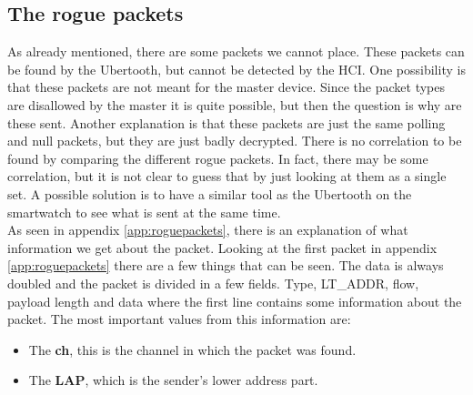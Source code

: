 \subsection{The rogue packets}
As already mentioned, there are some packets we cannot place. These packets can be found by the Ubertooth, but cannot be detected by the HCI. One possibility is that these packets are not meant for the master device. Since the packet types are disallowed by the master it is quite possible, but then the question is why are these sent. Another explanation is that these packets are just the same polling and null packets, but they are just badly decrypted. There is no correlation to be found by comparing the different rogue packets. In fact, there may be some correlation, but it is not clear to guess that by just looking at them as a single set. A possible solution is to have a similar tool as the Ubertooth on the smartwatch to see what is sent at the same time. \\
As seen in appendix \ref{app:roguepackets}, there is an explanation of what information we get about the packet.
Looking at the first packet in appendix \ref{app:roguepackets} there are a few things that can be seen. The data is always doubled and the packet is divided in a few fields. Type, LT\_ADDR, flow, payload length and data where the first line contains some information about the packet. The most important values from this information are:
\begin{itemize} 
\item The \textbf{ch}, this is the channel in which the packet was found.
\item The \textbf{LAP}, which is the sender's lower address part.
\end{itemize}
